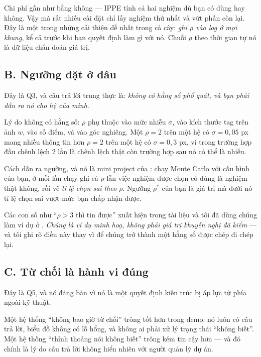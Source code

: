 \documentclass[../../marker.tex]{subfiles}
\begin{document}
Chi phí gần như bằng không --- IPPE tính cả hai nghiệm dù bạn có dùng hay không. Vậy mà rất nhiều cài đặt chỉ lấy nghiệm thứ nhất và vứt phần còn lại. Đây là một trong những cải thiện dễ nhất trong cả cây: \emph{ghi \(\rho\) vào log ở mọi khung}, kể cả trước khi bạn quyết định làm gì với nó. Chuỗi \(\rho\) theo thời gian tự nó là dữ liệu chẩn đoán giá trị.

\subsection{B. Ngưỡng đặt ở đâu}

Đây là Q3, và câu trả lời trung thực là: \emph{không có hằng số phổ quát, và bạn phải dẫn ra nó cho hệ của mình}.

Lý do không có hằng số: \(\rho\) phụ thuộc vào mức nhiễu \(\sigma\), vào kích thước tag trên ảnh \(w\), vào số điểm, và vào góc nghiêng. Một \(\rho = 2\) trên một hệ có \(\sigma = 0{,}05\) px mang nhiều thông tin hơn \(\rho = 2\) trên một hệ có \(\sigma = 0{,}3\) px, vì trong trường hợp đầu chênh lệch 2 lần là chênh lệch thật còn trường hợp sau nó có thể là nhiễu.

Cách dẫn ra ngưỡng, và nó là mini project của : chạy Monte Carlo với cấu hình của bạn, ở mỗi lần chạy ghi cả \(\rho\) lẫn việc nghiệm được chọn có đúng là nghiệm thật không, rồi vẽ \emph{tỉ lệ chọn sai theo \(\rho\)}. Ngưỡng \(\rho^*\) của bạn là giá trị mà dưới nó tỉ lệ chọn sai vượt mức bạn chấp nhận được.

Các con số như ``\(\rho > 3\) thì tin được'' xuất hiện trong tài liệu và tôi đã dùng chúng làm ví dụ ở . \emph{Chúng là ví dụ minh hoạ, không phải giá trị khuyến nghị đã kiểm} --- và tôi ghi rõ điều này thay vì để chúng trở thành một hằng số được chép đi chép lại.

\subsection{C. Từ chối là hành vi đúng}

Đây là Q5, và nó đáng bàn vì nó là một quyết định kiến trúc bị áp lực từ phía ngoài kỹ thuật.

Một hệ thống ``không bao giờ từ chối'' trông tốt hơn trong demo: nó luôn có câu trả lời, biểu đồ không có lỗ hổng, và không ai phải xử lý trạng thái ``không biết''. Một hệ thống ``thỉnh thoảng nói không biết'' trông kém tin cậy hơn --- và đó chính là lý do câu trả lời không hiển nhiên với người quản lý dự án.
\end{document}
